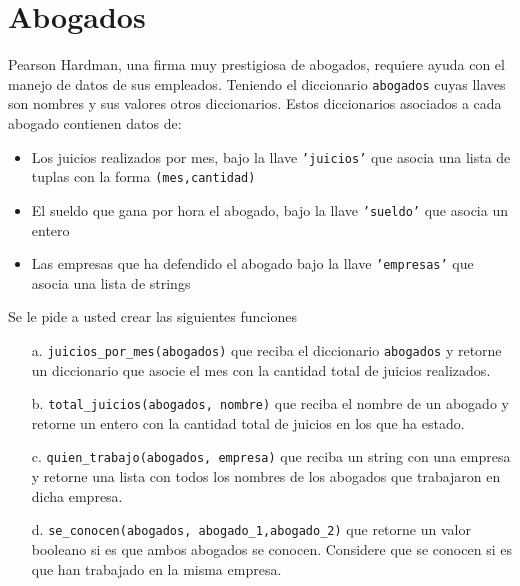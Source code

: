 \section{Abogados}

Pearson Hardman, una firma muy prestigiosa de abogados, requiere ayuda con el manejo de datos de sus empleados. Teniendo el diccionario \texttt{abogados} cuyas llaves son nombres y sus valores otros diccionarios. Estos diccionarios asociados a cada abogado contienen datos de:
\begin{itemize}
    \item Los juicios realizados por mes, bajo la llave \texttt{'juicios'} que asocia una lista de tuplas con la forma \texttt{(mes,cantidad)}
    \item El sueldo que gana por hora el abogado, bajo la llave \texttt{'sueldo'} que asocia un entero
    \item Las empresas que ha defendido el abogado bajo la llave \texttt{'empresas'} que asocia una lista de strings
\end{itemize}


Se le pide a usted crear las siguientes funciones
\begin{itemize}
    \item[a.] \texttt{juicios\_por\_mes(abogados)} que reciba el diccionario \texttt{abogados} y retorne un diccionario que asocie el mes con la cantidad total de juicios realizados.

    \item[b.] \texttt{total\_juicios(abogados, nombre)} que reciba el nombre de un abogado y retorne un entero con la cantidad total de juicios en los que ha estado.
    
    \item[c.] \texttt{quien\_trabajo(abogados, empresa)} que reciba un string con una empresa y retorne una lista con todos los nombres de los abogados que trabajaron en dicha empresa.

    \item[d.] \texttt{se\_conocen(abogados, abogado\_1,abogado\_2)} que retorne un valor booleano si es que ambos abogados se conocen. Considere que se conocen si es que han trabajado en la misma empresa.
\end{itemize}
